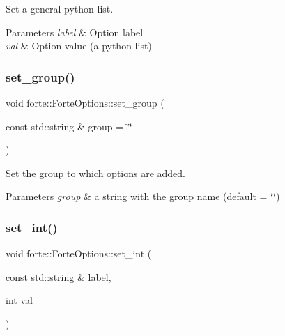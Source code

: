 Set a general python list. 


\begin{DoxyParams}{Parameters}
{\em label} & Option label \\
\hline
{\em val} & Option value (a python list) \\
\hline
\end{DoxyParams}
\mbox{\label{classforte_1_1_forte_options_a56aa020531457ca53a94da2fb5695618}} 
\subsubsection{\texorpdfstring{set\+\_\+group()}{set\_group()}}
{\footnotesize\ttfamily void forte\+::\+Forte\+Options\+::set\+\_\+group (\begin{DoxyParamCaption}\item[{const std\+::string \&}]{group = {\ttfamily \char`\"{}\char`\"{}} }\end{DoxyParamCaption})}



Set the group to which options are added. 


\begin{DoxyParams}{Parameters}
{\em group} & a string with the group name (default = \char`\"{}\char`\"{}) \\
\hline
\end{DoxyParams}
\mbox{\label{classforte_1_1_forte_options_a07cd921fa0a9b1705083e01f9251e860}} 
\subsubsection{\texorpdfstring{set\+\_\+int()}{set\_int()}}
{\footnotesize\ttfamily void forte\+::\+Forte\+Options\+::set\+\_\+int (\begin{DoxyParamCaption}\item[{const std\+::string \&}]{label,  }\item[{int}]{val }\end{DoxyParamCaption})}



